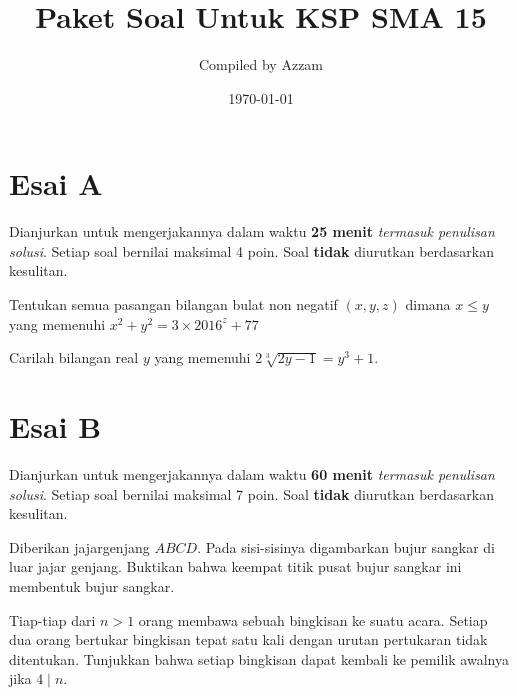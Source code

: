 \documentclass[11pt]{scrartcl}
\begin{document}
	\title{Paket Soal Untuk KSP SMA 15} %
	\date{\today}
	\author{Compiled by Azzam}
	\maketitle
	

	\section{Esai A}
	Dianjurkan untuk mengerjakannya dalam waktu \textbf{25 menit} \textit{termasuk penulisan solusi}. Setiap soal bernilai maksimal 4 poin. Soal \textbf{tidak} diurutkan berdasarkan kesulitan. 
	
	\begin{soalbaru}
	Tentukan semua pasangan bilangan bulat non negatif $(x,y,z)$ dimana $x \le y$ yang memenuhi $x^2+y^2=3\times 2016^z+77$
	\end{soalbaru}
	
	\begin{soalbaru}
	Carilah bilangan real $y$ yang memenuhi $2\sqrt[3]{2y-1}=y^3+1.$
	\end{soalbaru}
	
	\section{Esai B}
	Dianjurkan untuk mengerjakannya dalam waktu \textbf{60 menit} \textit{termasuk penulisan solusi}. Setiap soal bernilai maksimal 7 poin. Soal \textbf{tidak} diurutkan berdasarkan kesulitan.
	
	\begin{soalbaru}
		Diberikan jajargenjang $ABCD$. Pada sisi-sisinya digambarkan bujur sangkar di luar jajar genjang. Buktikan bahwa keempat titik pusat bujur sangkar ini membentuk bujur sangkar.
	\end{soalbaru} 
	
	\begin{soalbaru}
	Tiap-tiap dari $n >1$ orang membawa sebuah bingkisan ke suatu acara. Setiap dua orang bertukar bingkisan tepat satu kali dengan urutan pertukaran tidak ditentukan. Tunjukkan bahwa setiap bingkisan dapat kembali ke pemilik awalnya jika $4\mid n$.
	
	
	\end{soalbaru}
	
\end{document}
